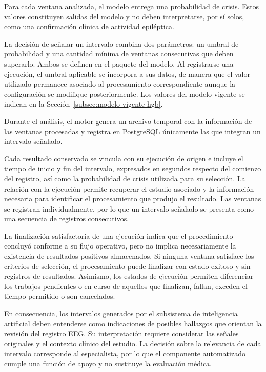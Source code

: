 Para cada ventana analizada, el modelo entrega una probabilidad de crisis.
Estos valores constituyen salidas del modelo y no deben interpretarse, por sí solos, como una confirmación clínica de actividad epiléptica.

La decisión de señalar un intervalo combina dos parámetros: un umbral de probabilidad y una cantidad mínima de ventanas consecutivas que deben superarlo.
Ambos se definen en el paquete del modelo.
Al registrarse una ejecución, el umbral aplicable se incorpora a sus datos, de manera que el valor utilizado permanece asociado al procesamiento correspondiente aunque la configuración se modifique posteriormente.
Los valores del modelo vigente se indican en la Sección~\ref{subsec:modelo-vigente-hgb}.

Durante el análisis, el motor genera un archivo temporal con la información de las ventanas procesadas y registra en PostgreSQL únicamente las que integran un intervalo señalado.

Cada resultado conservado se vincula con su ejecución de origen e incluye el tiempo de inicio y fin del intervalo, expresados en segundos respecto del comienzo del registro, así como la probabilidad de crisis utilizada para su selección. La relación con la ejecución permite recuperar el estudio asociado y la información necesaria para identificar el procesamiento que produjo el resultado. Las ventanas se registran individualmente, por lo que un intervalo señalado se presenta como una secuencia de registros consecutivos.

La finalización satisfactoria de una ejecución indica que el procedimiento concluyó conforme a su flujo operativo, pero no implica necesariamente la existencia de resultados positivos almacenados. Si ninguna ventana satisface los criterios de selección, el procesamiento puede finalizar con estado exitoso y sin registros de resultados. Asimismo, los estados de ejecución permiten diferenciar los trabajos pendientes o en curso de aquellos que finalizan, fallan, exceden el tiempo permitido o son cancelados.

En consecuencia, los intervalos generados por el subsistema de inteligencia artificial deben entenderse como indicaciones de posibles hallazgos que orientan la revisión del registro EEG. Su interpretación requiere considerar las señales originales y el contexto clínico del estudio. La decisión sobre la relevancia de cada intervalo corresponde al especialista, por lo que el componente automatizado cumple una función de apoyo y no sustituye la evaluación médica.


